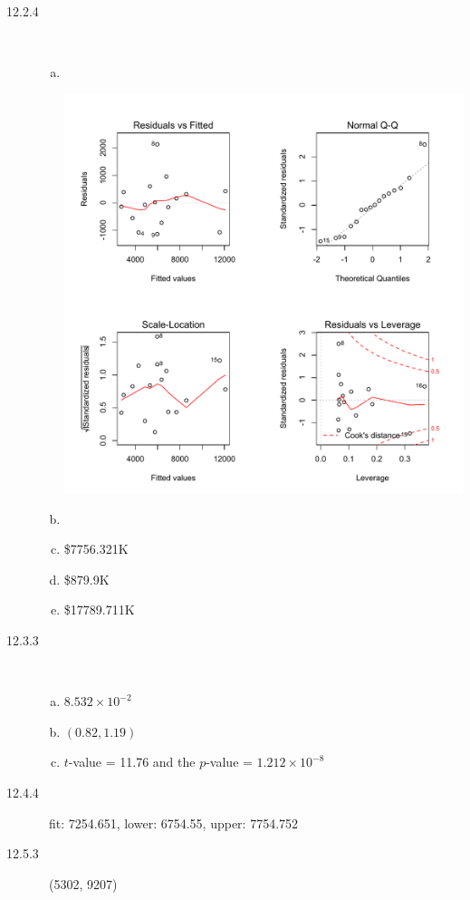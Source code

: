 \documentclass[letterpaper,10pt]{article}
\begin{document}
\begin{description}
\item[12.2.4]\ 
\begin{enumerate}[a)]
\item \ 
\begin{center}
\includegraphics[scale=0.75]{module9a.pdf}
\end{center}
\item
\item \$7756.321K
\item \$879.9K
\item \$17789.711K
\end{enumerate}

\item[12.3.3]\ 
\begin{enumerate}[a)]
\item $8.532\times10^{-2}$
\item $(0.82, 1.19)$
\item $t$-value = 11.76 and the $p$-value = $1.212\times10^{-8}$
\end{enumerate}

\item[12.4.4]\ 
fit: 7254.651, lower: 6754.55, upper: 7754.752

\item[12.5.3]\ 
(5302, 9207)


\end{description}
\end{document}
